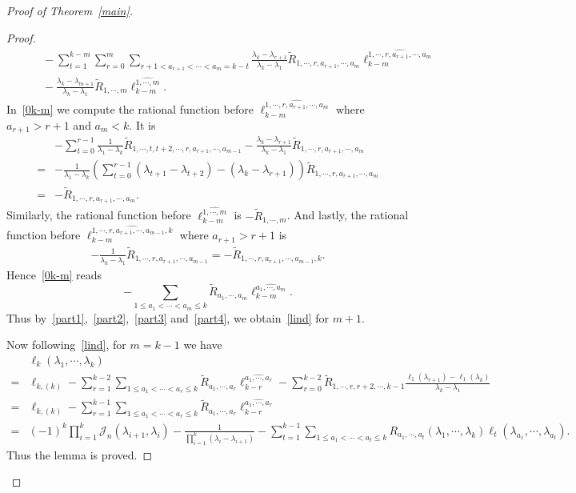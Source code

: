 \documentclass[a4paper]{article}
\theoremstyle{plain}
\theoremstyle{definition}
\newcommand{\nn}{\nonumber}
\begin{document}
\begin{proof}[Proof of Theorem~\ref{main}]
\begin{proof}
\begin{align}
		&\qquad -\sum_{t=1}^{k-m}\sum_{r=0}^{m}\sum_{r+1<a_{r+1}<\cdots<a_m=k-t} \frac{\lambda_k-\lambda_{r+1}}{\lambda_k-\lambda_1}\widetilde R_{1,\cdots,r,a_{r+1},\cdots,a_m}\ell_{k-m}^{\widehat{1,\cdots,r,a_{r+1},\cdots,a_m}}\nn\\
		&\qquad -\frac{\lambda_k-\lambda_{m+1}}{\lambda_k-\lambda_1}\widetilde R_{1,\cdots,m}\ell_{k-m}^{\widehat{1,\cdots,m}}.\label{0k-m}
	\end{align}
	In~\eqref{0k-m} we compute the rational function before $\ell_{k-m}^{\widehat{1,\cdots,r,a_{r+1},\cdots,a_{m}}}$ where $a_{r+1}>r+1$ and $a_{m}<k$. It is
	\begin{align}
		&-\sum_{t=0}^{r-1}\frac{1}{\lambda_1-\lambda_k}\widetilde R_{1,\cdots,t,t+2,\cdots,r,a_{r+1},\cdots,a_{m-1}}-\frac{\lambda_k-\lambda_{r+1}}{\lambda_k-\lambda_1}\widetilde R_{1,\cdots,r,a_{r+1},\cdots,a_m} \nn\\
		=&-\frac{1}{\lambda_1-\lambda_k}\left(\sum_{t=0}^{r-1}(\lambda_{t+1}-\lambda_{t+2})-(\lambda_k-\lambda_{r+1})\right)\widetilde R_{1,\cdots,r,a_{r+1},\cdots,a_{m}} \nn\\
		=&-\widetilde R_{1,\cdots,r,a_{r+1},\cdots,a_m}.
	\end{align}
	Similarly, the rational function before $\ell_{k-m}^{\widehat{1,\cdots,m}}$ is $-\widetilde R_{1,\cdots,m}$. And lastly, the rational function before $\ell_{k-m}^{\widehat{1,\cdots,r,a_{r+1},\cdots,a_{m-1},k}}$ where $a_{r+1}>r+1$ is
	\begin{align}
	-\frac{1}{\lambda_k-\lambda_1}\widetilde R_{1,\cdots,r,a_{r+1},\cdots,a_{m-1}} =-\widetilde R_{1,\cdots,r,a_{r+1},\cdots,a_{m-1},k}.
	\end{align}
	Hence~\eqref{0k-m} reads
	\begin{equation}
		-\sum_{1\le a_1<\cdots<a_m\le k}\widetilde R_{a_1,\cdots,a_m}\ell_{k-m}^{\widehat{a_1,\cdots,a_m}}. \label{part4}
	\end{equation}
	Thus by~\eqref{part1},~\eqref{part2},~\eqref{part3} and~\eqref{part4}, we obtain~\eqref{lind} for $m+1$.
	
	Now following~\eqref{lind}, for $m=k-1$ we have
	\begin{align}
		&\ell_k(\lambda_1,\cdots,\lambda_k)\nn\\
		=& \ell_{k,(k)}-\sum_{r=1}^{k-2}\sum_{1\le a_1<\cdots<a_r\le k}\widetilde R_{a_1,\cdots,a_r}\ell_{k-r}^{\widehat{a_1,\cdots,a_r}}-\sum_{r=0}^{k-2}\widetilde R_{1,\cdots,r,r+2,\cdots,k-1}\frac{\ell_1(\lambda_{r+1})-\ell_1(\lambda_k)}{\lambda_k-\lambda_1} \nn\\
		=& \ell_{k,(k)}-\sum_{r=1}^{k-1}\sum_{1\le a_1<\cdots<a_r\le k}\widetilde R_{a_1,\cdots,a_r}\ell_{k-r}^{\widehat{a_1,\cdots,a_r}} \nn\\
		=&(-1)^k\prod_{i=1}^k\mathcal J_n(\lambda_{i+1},\lambda_i)-\frac{1}{\prod_{i=1}^k(\lambda_i-\lambda_{i+1})}-\sum_{t=1}^{k-1}\sum_{1\le a_1<\cdots<a_t\le k}R_{a_1,\cdots,a_t}(\lambda_1,\cdots,\lambda_k)\ell_t(\lambda_{a_1},\cdots,\lambda_{a_t}).
	\end{align}
	Thus the lemma is proved.
\end{proof}



\end{proof}
\end{document}
